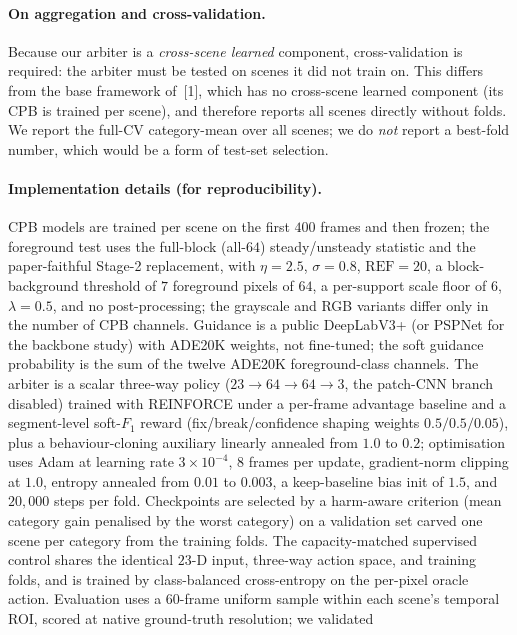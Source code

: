 \documentclass[sn-basic]{sn-jnl}
\begin{document}
\paragraph{On aggregation and cross-validation.}
Because our arbiter is a \emph{cross-scene learned} component, cross-validation is
required: the arbiter must be tested on scenes it did not train on. This differs from
the base framework of~[1], which has no cross-scene learned component (its CPB is
trained per scene), and therefore reports all scenes directly without folds. We
report the full-CV category-mean over all scenes; we do \emph{not} report a
best-fold number, which would be a form of test-set selection.

\paragraph{Implementation details (for reproducibility).}
CPB models are trained per scene on the first $400$ frames and then frozen; the
foreground test uses the full-block (all-$64$) steady/unsteady statistic and the
paper-faithful Stage-2 replacement, with $\eta=2.5$, $\sigma=0.8$, $\mathrm{REF}=20$, a
block-background threshold of $7$ foreground pixels of $64$, a per-support scale floor of
$6$, $\lambda=0.5$, and no post-processing; the grayscale and RGB variants differ only in
the number of CPB channels. Guidance is a public DeepLabV3+ (or PSPNet for the backbone
study) with ADE20K weights, not fine-tuned; the soft guidance probability is the sum of
the twelve ADE20K foreground-class channels. The arbiter is a scalar three-way policy
($23\!\rightarrow\!64\!\rightarrow\!64\!\rightarrow\!3$, the patch-CNN branch disabled)
trained with REINFORCE under a per-frame advantage baseline and a segment-level
soft-$F_1$ reward (fix/break/confidence shaping weights $0.5/0.5/0.05$), plus a
behaviour-cloning auxiliary linearly annealed from $1.0$ to $0.2$; optimisation uses Adam
at learning rate $3\times10^{-4}$, $8$ frames per update, gradient-norm clipping at $1.0$,
entropy annealed from $0.01$ to $0.003$, a keep-baseline bias init of $1.5$, and $20{,}000$
steps per fold. Checkpoints are selected by a harm-aware criterion (mean category gain
penalised by the worst category) on a validation set carved one scene per category from
the training folds. The capacity-matched supervised control shares the identical $23$-D
input, three-way action space, and training folds, and is trained by class-balanced
cross-entropy on the per-pixel oracle action. Evaluation uses a $60$-frame uniform sample
within each scene's temporal ROI, scored at native ground-truth resolution; we validated
\end{document}
